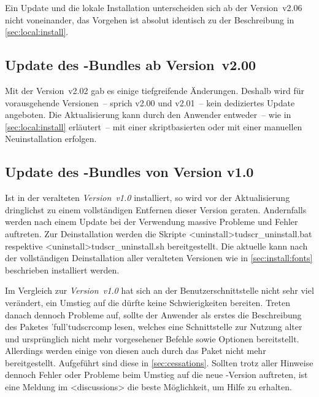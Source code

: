 Ein Update und die lokale Installation unterscheiden sich ab der Version~v2.06 
nicht voneinander, das Vorgehen ist absolut identisch zu der Beschreibung in 
\autoref{sec:local:install}.



\subsection{Update des \TUDScript-Bundles ab Version~v2.00}

Mit der Version~v2.02 gab es einige tiefgreifende Änderungen. Deshalb wird für 
vorausgehende Versionen~-- sprich v2.00 und v2.01~-- kein dediziertes Update 
angeboten. Die Aktualisierung kann durch den Anwender entweder~-- wie in 
\autoref{sec:local:install} erläutert~-- mit einer skriptbasierten oder mit 
einer manuellen Neuinstallation erfolgen.%
%



\subsection{Update des \TUDScript-Bundles von Version v1.0}

Ist \TUDScript in der veralteten \emph{Version~v1.0} installiert, so wird vor 
der Aktualisierung dringlichst zu einem vollständigen Entfernen dieser Version 
geraten. Andernfalls werden nach einem Update bei der Verwendung massive 
Probleme und Fehler auftreten. Zur Deinstallation werden die Skripte 
\GitHubDownload*<uninstall>{tudscr_uninstall.bat} respektive
\GitHubDownload*<uninstall>{tudscr_uninstall.sh} bereitgestellt. Die aktuelle 
 kann nach der vollständigen Deinstallation aller 
veralteten Versionen wie in \autoref{sec:install:fonts} beschrieben installiert 
werden.

Im Vergleich zur \emph{Version~v1.0} hat sich an der Benutzerschnittstelle 
nicht sehr viel verändert, ein Umstieg auf die  dürfte 
keine Schwierigkeiten bereiten. Treten danach dennoch Probleme auf, sollte der 
Anwender als erstes die Beschreibung des Paketes \Package'full'{tudscrcomp} 
lesen, welches eine Schnittstelle zur Nutzung alter und ursprünglich nicht mehr 
vorgesehener Befehle sowie Optionen bereitstellt. Allerdings werden einige von 
diesen auch durch das Paket  nicht mehr bereitgestellt. 
Aufgeführt sind diese in \autoref{sec:cessations}. Sollten trotz aller Hinweise 
dennoch Fehler oder Probleme beim Umstieg auf die neue \TUDScript-Version 
auftreten, ist eine Meldung im \GitHubRepo<discussions> die beste Möglichkeit, 
um Hilfe zu erhalten.



